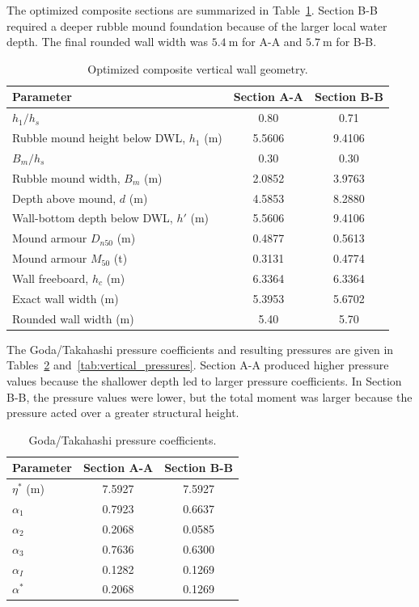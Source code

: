 \documentclass[a4paper, 11pt]{article}
\begin{document}
The optimized composite sections are summarized in Table~\ref{tab:vertical_geometry}. Section B-B required a deeper rubble mound foundation because of the larger local water depth. The final rounded wall width was \(5.4~\mathrm{m}\) for A-A and \(5.7~\mathrm{m}\) for B-B.

\begin{table}[H]
\centering
\caption{Optimized composite vertical wall geometry.}
\label{tab:vertical_geometry}
\begin{tabular}{l c c}
\hline
Parameter & Section A-A & Section B-B \\
\hline
\(h_1/h_s\) & 0.80 & 0.71 \\
Rubble mound height below DWL, \(h_1\) (m) & 5.5606 & 9.4106 \\
\(B_m/h_s\) & 0.30 & 0.30 \\
Rubble mound width, \(B_m\) (m) & 2.0852 & 3.9763 \\
Depth above mound, \(d\) (m) & 4.5853 & 8.2880 \\
Wall-bottom depth below DWL, \(h'\) (m) & 5.5606 & 9.4106 \\
Mound armour \(D_{n50}\) (m) & 0.4877 & 0.5613 \\
Mound armour \(M_{50}\) (t) & 0.3131 & 0.4774 \\
Wall freeboard, \(h_c\) (m) & 6.3364 & 6.3364 \\
Exact wall width (m) & 5.3953 & 5.6702 \\
Rounded wall width (m) & 5.40 & 5.70 \\
\hline
\end{tabular}
\end{table}

The Goda/Takahashi pressure coefficients and resulting pressures are given in Tables~\ref{tab:vertical_coefficients} and~\ref{tab:vertical_pressures}. Section A-A produced higher pressure values because the shallower depth led to larger pressure coefficients. In Section B-B, the pressure values were lower, but the total moment was larger because the pressure acted over a greater structural height.

\begin{table}[H]
\centering
\caption{Goda/Takahashi pressure coefficients.}
\label{tab:vertical_coefficients}
\begin{tabular}{l c c}
\hline
Parameter & Section A-A & Section B-B \\
\hline
\(\eta^*\) (m) & 7.5927 & 7.5927 \\
\(\alpha_1\) & 0.7923 & 0.6637 \\
\(\alpha_2\) & 0.2068 & 0.0585 \\
\(\alpha_3\) & 0.7636 & 0.6300 \\
\(\alpha_I\) & 0.1282 & 0.1269 \\
\(\alpha^*\) & 0.2068 & 0.1269 \\
\hline
\end{tabular}
\end{table}
\end{document}
